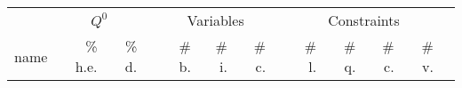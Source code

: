 {\tiny
\begin{longtable}{lrrrrrrrrrrrr}
\toprule

	&		\multicolumn{2}{c}{$Q^0$}		&	&	\multicolumn{3}{c}{Variables}					&	&	\multicolumn{4}{c}{Constraints}							\\
name	&	\% h.e.	&	\% d.	&	&	\# b.	&	\# i. 	&	\# c. 	&	&	\# l. 	&	\# q. 	&	\# c. 	&	\# v.	\\[2 ex]

\endhead 														


\end{longtable}}
